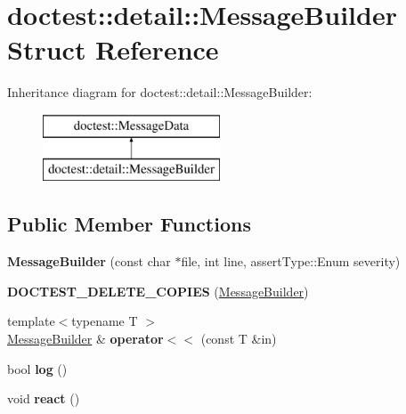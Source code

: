 \hypertarget{structdoctest_1_1detail_1_1_message_builder}{}\section{doctest\+::detail\+::Message\+Builder Struct Reference}
\label{structdoctest_1_1detail_1_1_message_builder}
Inheritance diagram for doctest\+::detail\+::Message\+Builder\+:\begin{figure}[H]
\begin{center}
\leavevmode
\includegraphics[height=2.000000cm]{structdoctest_1_1detail_1_1_message_builder}
\end{center}
\end{figure}
\subsection*{Public Member Functions}
\begin{DoxyCompactItemize}
\item 
\mbox{\label{structdoctest_1_1detail_1_1_message_builder_a93cb6f180968d38cb0f18b08ec6c9000}} 
{\bfseries Message\+Builder} (const char $\ast$file, int line, assert\+Type\+::\+Enum severity)
\item 
\mbox{\label{structdoctest_1_1detail_1_1_message_builder_ae264a629829788e69dbb8aa6487b9f11}} 
{\bfseries D\+O\+C\+T\+E\+S\+T\+\_\+\+D\+E\+L\+E\+T\+E\+\_\+\+C\+O\+P\+I\+ES} (\mbox{\hyperlink{structdoctest_1_1detail_1_1_message_builder}{Message\+Builder}})
\item 
\mbox{\label{structdoctest_1_1detail_1_1_message_builder_ab9059f961c58179c998c89fc221ec804}} 
{\footnotesize template$<$typename T $>$ }\\\mbox{\hyperlink{structdoctest_1_1detail_1_1_message_builder}{Message\+Builder}} \& {\bfseries operator$<$$<$} (const T \&in)
\item 
\mbox{\label{structdoctest_1_1detail_1_1_message_builder_a9bcc5d56e1764a7e07efebca55e43cce}} 
bool {\bfseries log} ()
\item 
\mbox{\label{structdoctest_1_1detail_1_1_message_builder_a3a65c5e39a0c04ae8e2a7c34997a2e4d}} 
void {\bfseries react} ()
\end{DoxyCompactItemize}
